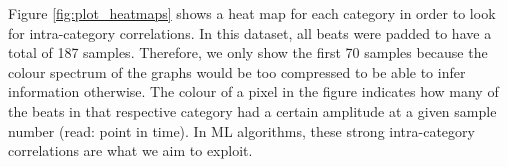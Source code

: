 \documentclass[a4paper,10pt,twocolumn]{article}
\begin{document}



Figure \ref{fig:plot_heatmaps} shows a heat map for each category in order to look for intra-category correlations. In this dataset, all beats were padded to have a total of 187 samples. Therefore, we only show the first 70 samples because the colour spectrum of the graphs would be too compressed to be able to infer information otherwise. The colour of a pixel in the figure indicates how many of the beats in that respective category had a certain amplitude at a given sample number (read: point in time). In ML algorithms, these strong intra-category correlations are what we aim to exploit.


\end{document}
